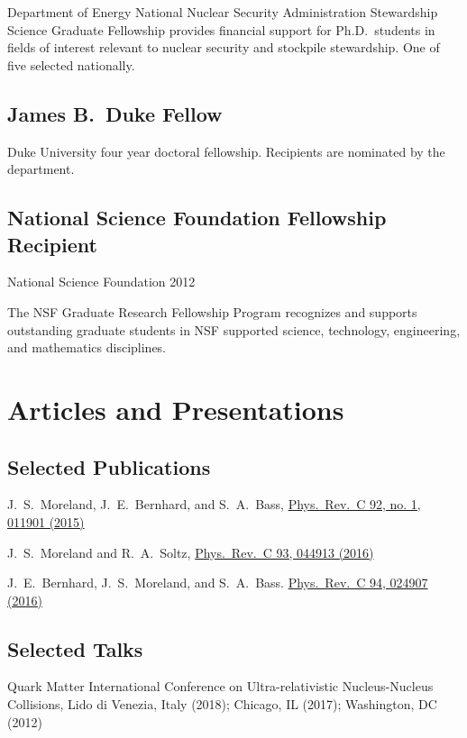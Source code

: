 \documentclass[letterpaper,10pt]{article}
\begin{document}
\begin{multicols}{2}
Department of Energy National Nuclear Security Administration Stewardship Science Graduate Fellowship provides financial support for Ph.D.\ students in fields of interest relevant to nuclear security and stockpile stewardship.
One of five selected nationally.

\subsection{James B.\ Duke Fellow}

Duke University four year doctoral fellowship. Recipients are nominated by the department.

\subsection{National Science Foundation Fellowship Recipient}
{\small National Science Foundation \hfill 2012}

The NSF Graduate Research Fellowship Program recognizes and supports outstanding graduate students in NSF supported science, technology, engineering, and mathematics disciplines.

\section{Articles and Presentations}

\subsection{Selected Publications}
\smallskip

J.\ S.\ Moreland, J.\ E.\ Bernhard, and S.\ A.\ Bass,
\href{https://arxiv.org/abs/1412.4708}{Phys.\ Rev.\ C 92, no. 1, 011901 (2015)}

J.\ S.\ Moreland and R.\ A.\ Soltz,
\href{https://arxiv.org/abs/1512.02189}{Phys.\ Rev.\ C 93, 044913 (2016)}

J.\ E.\ Bernhard, J.\ S.\ Moreland, and S.\ A.\ Bass.
\href{https://arxiv.org/abs/1605.03954}{Phys.\ Rev.\ C 94, 024907 (2016)}

\subsection{Selected Talks}
\smallskip

Quark Matter International Conference on Ultra-relativistic Nucleus-Nucleus Collisions, Lido di Venezia, Italy (2018); Chicago, IL (2017); Washington, DC (2012)


\end{multicols}
\end{document}
